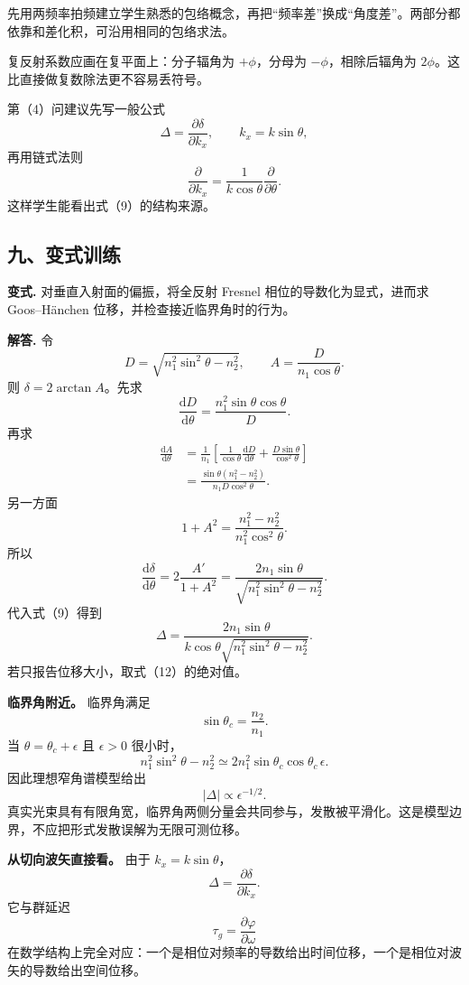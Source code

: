 \documentclass[12pt,a4paper,UTF8]{ctexart}
\begin{document}
先用两频率拍频建立学生熟悉的包络概念，再把``频率差''换成``角度差''。两部分都依靠和差化积，可沿用相同的包络求法。

复反射系数应画在复平面上：分子辐角为 \(+\phi\)，分母为
\(-\phi\)，相除后辐角为 \(2\phi\)。这比直接做复数除法更不容易丢符号。

第（4）问建议先写一般公式 \[
\Delta=\frac{\partial\delta}{\partial k_x},
\qquad k_x=k\sin\theta,
\] 再用链式法则 \[
\frac{\partial}{\partial k_x}
=\frac1{k\cos\theta}\frac{\partial}{\partial\theta}.
\] 这样学生能看出式（9）的结构来源。

\subsection{九、变式训练}\label{ux4e5dux53d8ux5f0fux8badux7ec3-7}

\textbf{变式.} 对垂直入射面的偏振，将全反射 Fresnel
相位的导数化为显式，进而求 Goos--Hänchen
位移，并检查接近临界角时的行为。

\textbf{解答.} 令 \[
D=\sqrt{n_1^2\sin^2\theta-n_2^2},
\qquad
A=\frac{D}{n_1\cos\theta}.
\] 则 \(\delta=2\arctan A\)。先求 \[
\frac{\mathrm dD}{\mathrm d\theta}
=\frac{n_1^2\sin\theta\cos\theta}{D}.
\] 再求 \[
\begin{aligned}
\frac{\mathrm dA}{\mathrm d\theta}
&=\frac1{n_1}
\left[
\frac1{\cos\theta}\frac{\mathrm dD}{\mathrm d\theta}
+\frac{D\sin\theta}{\cos^2\theta}
\right]\\
&=\frac{\sin\theta(n_1^2-n_2^2)}
{n_1D\cos^2\theta}.
\end{aligned}
\] 另一方面 \[
1+A^2
=\frac{n_1^2-n_2^2}{n_1^2\cos^2\theta}.
\] 所以 \[
\boxed{
\frac{\mathrm d\delta}{\mathrm d\theta}
=2\frac{A'}{1+A^2}
=\frac{2n_1\sin\theta}
{\sqrt{n_1^2\sin^2\theta-n_2^2}}
}. \tag{11}
\] 代入式（9）得到 \[
\boxed{
\Delta
=\frac{2n_1\sin\theta}
{k\cos\theta\sqrt{n_1^2\sin^2\theta-n_2^2}}
}. \tag{12}
\] 若只报告位移大小，取式（12）的绝对值。

\textbf{临界角附近。} 临界角满足 \[
\sin\theta_c=\frac{n_2}{n_1}.
\] 当 \(\theta=\theta_c+\epsilon\) 且 \(\epsilon>0\) 很小时， \[
n_1^2\sin^2\theta-n_2^2
\simeq2n_1^2\sin\theta_c\cos\theta_c\,\epsilon.
\] 因此理想窄角谱模型给出 \[
|\Delta|\propto\epsilon^{-1/2}.
\]
真实光束具有有限角宽，临界角两侧分量会共同参与，发散被平滑化。这是模型边界，不应把形式发散误解为无限可测位移。

\textbf{从切向波矢直接看。} 由于 \(k_x=k\sin\theta\)， \[
\Delta=\frac{\partial\delta}{\partial k_x}.
\] 它与群延迟 \[
\tau_g=\frac{\partial\varphi}{\partial\omega}
\]
在数学结构上完全对应：一个是相位对频率的导数给出时间位移，一个是相位对波矢的导数给出空间位移。
\end{document}
